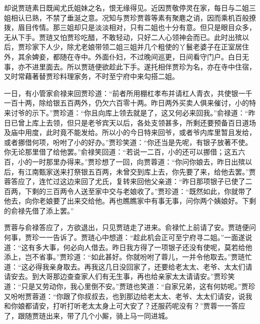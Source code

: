 \begin{parag}
    却说贾琏素日既闻尤氏姐妹之名，恨无缘得见。近因贾敬停灵在家，每日与二姐三姐相认已熟，不禁了垂涎之意。况知与贾珍贾蓉等素有聚麀之诮，因而乘机百般撩拨，眉目传情。那三姐却只是淡淡相对，只有二姐也十分有意。但只是眼目众多，无从下手。贾琏又怕贾珍吃醋，不敢轻动，只好二人心领神会而已。此时出殡以后，贾珍家下人少，除尤老娘带领二姐三姐并几个粗使的丫鬟老婆子在正室居住外，其余婢妾，都随在寺中。外面仆妇，不过晚间巡更，日间看守门户。白日无事，亦不进里面去。所以贾琏便欲趁此下手。遂托相伴贾珍为名，亦在寺中住宿，又时常藉著替贾珍料理家务，不时至宁府中来勾搭二姐。
\end{parag}


\begin{parag}
    一日，有小管家俞禄来回贾珍道：“前者所用棚杠孝布并请杠人青衣，共使银一千一百十两，除给银五百两外，仍欠六百零十两。昨日两外买卖人俱来催讨，小的特来讨爷的示下。”贾珍道：“你且向库上领去就是了，这又何必来回我。”俞禄道：“昨日已曾上库上去领，但只是老爷宾天以后，各处支领甚多，所剩还要预备百日道场及庙中用度，此时竟不能发给。所以小的今日特来回爷，或者爷内库里暂且发给，或者挪借何项，吩咐了小的好办。”贾珍笑道：“你还当是先呢，有银子放著不使。你无论那里借了给他罢。”俞禄笑回道：“若说一二百，小的还可以挪借；这五六百，小的一时那里办得来。”贾珍想了一回，向贾蓉道：“你问你娘去，昨日出殡以后，有江南甄家送来打祭银五百两，未曾交到库上去，你先要了来，给他去罢。”贾蓉答应了，连忙过这边来回了尤氏，复转来回他父亲道：“昨日那项银子已使了二百两，下剩的三百两令人送至家中交与老娘收了。”贾珍道：“既然如此，你就带了他去，向你老娘要了出来交给他。再也瞧瞧家中有事无事，问你两个姨娘好。下剩的俞禄先借了添上罢。”
\end{parag}


\begin{parag}
    贾蓉与俞禄答应了，方欲退出，只见贾琏走了进来。俞禄忙上前请了安。贾琏便问何事，贾珍一一告诉了。贾琏心中想道：“趁此机会正可至宁府寻二姐。”一面遂说道：“这有多大事，何必向人借去。昨日我方得了一项银子还没有使呢，莫若给他添上，岂不省事。”贾珍道：“如此甚好。你就吩咐了蓉儿，一并令他取去。”贾琏忙道：“这必得我亲身取去。再我这几日没回家了，还要给老太太、老爷、太太们请请安去。到大哥那边查查家人们有无生事，再也给亲家太太请请安。”贾珍笑道：“只是又劳动你，我心里倒不安。”贾琏也笑道：“自家兄弟，这有何妨呢。”贾珍又吩咐贾蓉道：“你跟了你叔叔去，也到那边给老太太、老爷、太太们请安，说我和你娘都请安，打听打听老太太身上可大安了？还服药呢没有？”贾蓉一一答应了，跟随贾琏出来，带了几个小厮，骑上马一同进城。
\end{parag}


